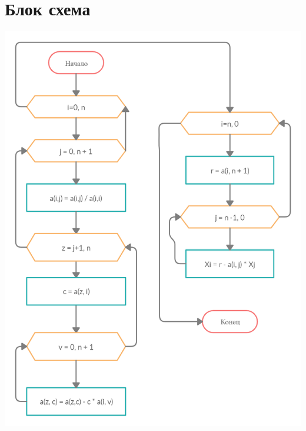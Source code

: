 \documentclass[12pt,letterpaper]{article}
\begin{document}
\section*{Блок схема}
\begin{center}
    \includegraphics[scale=0.4]{1.jpg}
\end{center}

\newpage
\end{document}
